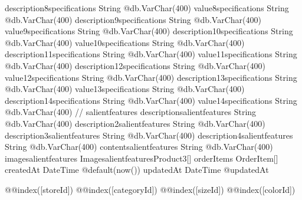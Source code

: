 {  description8specifications   String                         @db.VarChar(400)
  value8specifications         String                         @db.VarChar(400)
  description9specifications   String                         @db.VarChar(400)
  value9specifications         String                         @db.VarChar(400)
  description10specifications  String                         @db.VarChar(400)
  value10specifications        String                         @db.VarChar(400)
  description11specifications  String                         @db.VarChar(400)
  value11specifications        String                         @db.VarChar(400)
  description12specifications  String                         @db.VarChar(400)
  value12specifications        String                         @db.VarChar(400)
  description13specifications  String                         @db.VarChar(400)
  value13specifications        String                         @db.VarChar(400)
  description14specifications  String                         @db.VarChar(400)
  value14specifications        String                         @db.VarChar(400)
  // salientfeatures
  descriptionsalientfeatures   String                         @db.VarChar(400)
  description2salientfeatures  String                         @db.VarChar(400)
  description3salientfeatures  String                         @db.VarChar(400)
  description4salientfeatures  String                         @db.VarChar(400)
  contentsalientfeatures       String                         @db.VarChar(400)
  imagesalientfeatures ImagesalientfeaturesProduct3[]
  orderItems                   OrderItem[]
  createdAt                    DateTime                       @default(now())
  updatedAt                    DateTime                       @updatedAt

  @@index([storeId])
  @@index([categoryId])
  @@index([sizeId])
  @@index([colorId])
}

